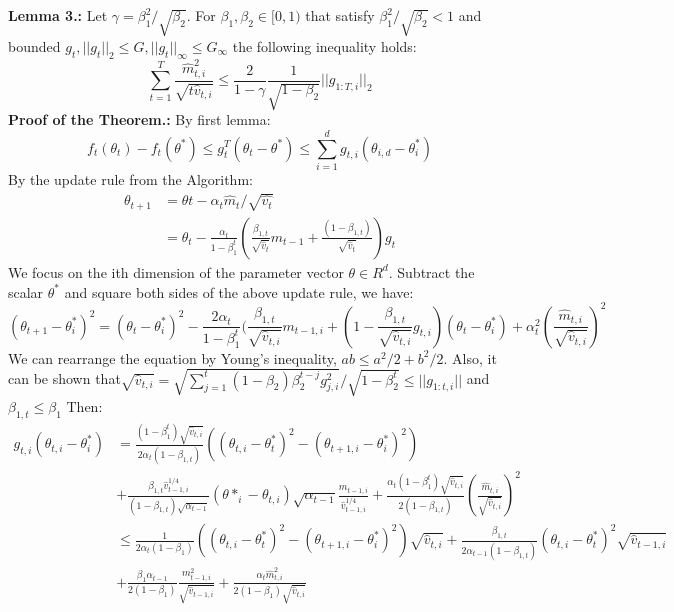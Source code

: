 \documentclass[10pt]{article}
\begin{document}
\textbf{Lemma 3.:} Let $\gamma = \beta_1^2/\sqrt{\beta_2}$. For $\beta_1, \beta_2 \in [0,1)$ that satisfy $\beta_1^2/\sqrt{\beta_2} < 1$ and bounded $g_t, ||g_t||_2 \leq G, ||g_t||_\infty \leq G_\infty$ the following inequality holds:
$$  \sum^T_{t=1} \frac{\hat{m}^2_{t,i}}{\sqrt{t\hat{v}_{t,i}}} \leq \frac{2}{1-\gamma} \frac{1}{\sqrt{1-\beta_2}} ||g_{1:T,i}||_2
$$ 
\textbf{Proof of the Theorem.:} By first lemma: 
$$
f_t(\theta_t) - f_t(\theta^*) \leq g_t^T(\theta_t - \theta^*) \leq \sum_{i=1}^d g_{t,i}(\theta_{i,d}-\theta_i^*)
$$
By the update rule from the Algorithm:
\begin{align*}
\theta_{t+1} &= \theta{t} - \alpha_t \hat{m}_t / \sqrt{\hat{v_t}} \\
&= \theta_t - \frac{\alpha_t}{1-\beta_1^t}(\frac{\beta_{1,t}}{\sqrt{\hat{v}_t}} m_{t-1} + \frac{(1-\beta_{1,t})}{\sqrt{\hat{v}_t}})g_t
\end{align*}
We focus on the ith dimension of the parameter vector $\theta \in R^d$. Subtract the scalar $\theta^*$ and square both sides of the above update rule, we have:
$$
(\theta_{t+1} - \theta^*_i)^2 = (\theta_{t} - \theta^*_i)^2 - \frac{2 \alpha_t}{1-\beta^t_1}(\frac{\beta_{1,t}}{\sqrt{\hat{v}_{t,i}}}m_{t-1,i} + (1- \frac{\beta_{1,t}}{\sqrt{\hat{v}_{t,i}}} g_{t,i})(\theta_{t} - \theta^*_i) + \alpha^2_t(\frac{\hat{m}_{t,i}}{\sqrt{\hat{v}_{t,i}}})^2
$$
We can rearrange the equation by Young's inequality, $ab \leq a^2/2 + b^2 / 2$. Also, it can be shown that$ \sqrt{\hat{v}_{t,i}} = \sqrt{\sum^t_{j=1}(1-\beta_2)\beta_2^{t-j}g^2_{j,i}} / \sqrt{1-\beta^t_2} \leq ||g_{1:t,i} ||$ and $ \beta_{1,t} \leq \beta_1$ Then:
\begin{align*}
g_{t,i}(\theta_{t,i} - \theta^*_i) &= \frac{(1-\beta^t_1)\sqrt{\hat{v}_{t,i}}}{2 \alpha_t(1-\beta_{1,t})}((\theta_{t,i} - \theta^*_t)^2 - (\theta_{t+1,i} - \theta^*_i)^2 ) \\
&+ \frac{\beta_{1,t} \hat{v}^{1/4}_{t-1,i}}{(1-\beta_{1,t}) \sqrt{\alpha_{t-1}}}(\theta*_i - \theta_{t,i}) \sqrt{\alpha_{t-1}} \frac{m_{t-1,i}}{\hat{v}^{1/4}_{t-1,i}} + \frac{\alpha_t(1-\beta^t_1)\sqrt{\hat{v}_{t,i}}}{2(1-\beta_{1,t})}( \frac{\hat{m}_{t,i}}{ \sqrt{\hat{v}_{t,i}}})^2 \\
&\leq \frac{1}{2 \alpha_t (1 - \beta_1)} ((\theta_{t,i} - \theta^*_t)^2 - (\theta_{t+1,i} - \theta^*_i)^2 ) \sqrt{\hat{v}_{t,i}} + \frac{\beta_{1,t}}{2\alpha_{t-1}(1 - \beta_{1,t})}(\theta_{t,i} - \theta^*_t)^2 \sqrt{\hat{v}_{t-1,i}} \\
&+ \frac{\beta_1 \alpha_{t-1}}{2(1-\beta_1)} \frac{m^2_{t-1,i}}{\sqrt{\hat{v}_{t-1,i}}} + \frac{\alpha_t \hat{m}^2_{t,i}}{2(1-\beta_1) \sqrt{\hat{v}_{t,i}}}
\end{align*}
\end{document}
